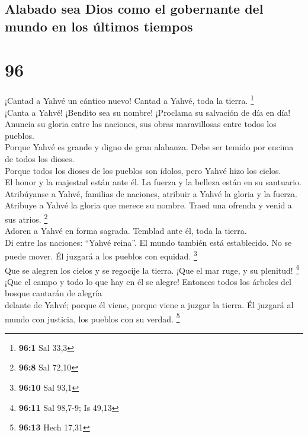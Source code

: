 \hypertarget{alabado-sea-dios-como-el-gobernante-del-mundo-en-los-uxfaltimos-tiempos}{%
\subsection{Alabado sea Dios como el gobernante del mundo en los últimos
tiempos}\label{alabado-sea-dios-como-el-gobernante-del-mundo-en-los-uxfaltimos-tiempos}}

\hypertarget{section-93}{%
\section{96}\label{section-93}}

 ¡Cantad a Yahvé un cántico nuevo! Cantad a Yahvé, toda la
tierra. \footnote{\textbf{96:1} Sal 33,3}\\
 ¡Canta a Yahvé! ¡Bendito sea su nombre! ¡Proclama su
salvación de día en día!\\
 Anuncia su gloria entre las naciones, sus obras
maravillosas entre todos los pueblos.\\
 Porque Yahvé es grande y digno de gran alabanza. Debe ser
temido por encima de todos los dioses.\\
 Porque todos los dioses de los pueblos son ídolos, pero
Yahvé hizo los cielos.\\
 El honor y la majestad están ante él. La fuerza y la
belleza están en su santuario.\\
 Atribúyanse a Yahvé, familias de naciones, atribuir a
Yahvé la gloria y la fuerza.\\
 Atribuye a Yahvé la gloria que merece su nombre. Traed
una ofrenda y venid a sus atrios. \footnote{\textbf{96:8} Sal 72,10}\\
 Adoren a Yahvé en forma sagrada. Temblad ante él, toda la
tierra.\\
 Di entre las naciones: ``Yahvé reina''. El mundo también
está establecido. No se puede mover. Él juzgará a los pueblos con
equidad. \footnote{\textbf{96:10} Sal 93,1}\\
 Que se alegren los cielos y se regocije la tierra. ¡Que
el mar ruge, y su plenitud! \footnote{\textbf{96:11} Sal 98,7-9; Is
  49,13}\\
 ¡Que el campo y todo lo que hay en él se alegre!
Entonces todos los árboles del bosque cantarán de alegría\\
 delante de Yahvé; porque él viene, porque viene a juzgar
la tierra. Él juzgará al mundo con justicia, los pueblos con su verdad.
\footnote{\textbf{96:13} Hech 17,31}

